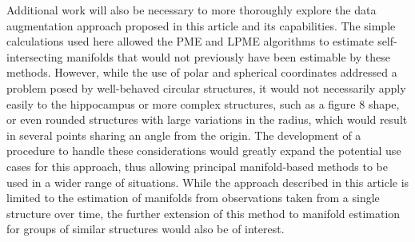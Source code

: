 \documentclass[11pt,reqno]{article}
\newcommand{\meng}[1]{{\color{purple} \sf $\clubsuit\clubsuit\clubsuit$ Kun Meng: [#1]}}
\theoremstyle{definition}
\begin{document}
Additional work will also be necessary to more thoroughly explore the data augmentation approach proposed in this article and its capabilities. The simple calculations used here allowed the PME and LPME algorithms to estimate self-intersecting manifolds that would not previously have been estimable by these methods. However, while the use of polar and spherical coordinates addressed a problem posed by well-behaved circular structures, it would not necessarily apply easily to the hippocampus or more complex structures, such as a figure 8 shape, or even rounded structures with large variations in the radius, which would result in several points sharing an angle from the origin. The development of a procedure to handle these considerations would greatly expand the potential use cases for this approach, thus allowing principal manifold-based methods to be used in a wider range of situations. While the approach described in this article is limited to the estimation of manifolds from observations taken from a single structure over time, the further extension of this method to manifold estimation for groups of similar structures would also be of interest.

\newpage

\nocite{*}
%
%
\printbibliography
\end{document}
